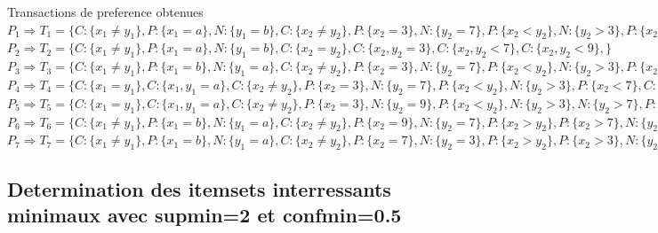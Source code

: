 \documentclass[a4paper,12pt,openany,oneside]{article}
\begin{document}
        
        Transactions de preference obtenues\\
        
        \noindent $P_{1}\Rightarrow T_{1}=\{C:\{x_{1}\neq y_{1}\},P:\{x_{1}=a\},N:\{y_{1}=b\},C:\{x_{2}\neq y_{2}\},P:\{x_{2}=3\},N:\{y_{2}=7\},P:\{x_{2}<y_{2}\},N:\{y_{2}>3\},P:\{x_{2}<7\},C:\{x_{2},y_{2}<9\},\}$ \\
        
        \noindent $P_{2}\Rightarrow T_{2}=\{C:\{x_{1}\neq y_{1}\},P:\{x_{1}=a\},N:\{y_{1}=b\},C:\{x_{2}=y_{2}\},C:\{x_{2},y_{2}=3\},C:\{x_{2},y_{2}<7\},C:\{x_{2},y_{2}<9\},\}$ \\
        
        \noindent $P_{3}\Rightarrow T_{3}=\{C:\{x_{1}\neq y_{1}\},P:\{x_{1}=b\},N:\{y_{1}=a\},C:\{x_{2}\neq y_{2}\},P:\{x_{2}=3\},N:\{y_{2}=7\},P:\{x_{2}<y_{2}\},N:\{y_{2}>3\},P:\{x_{2}<7\},C:\{x_{2},y_{2}<9\},\}$ \\
        
        \noindent $P_{4}\Rightarrow T_{4}=\{C:\{x_{1}=y_{1}\},C:\{x_{1},y_{1}=a\},C:\{x_{2}\neq y_{2}\},P:\{x_{2}=3\},N:\{y_{2}=7\},P:\{x_{2}<y_{2}\},N:\{y_{2}>3\},P:\{x_{2}<7\},C:\{x_{2},y_{2}<9\},\}$ \\
        
        \noindent $P_{5}\Rightarrow T_{5}=\{C:\{x_{1}=y_{1}\},C:\{x_{1},y_{1}=a\},C:\{x_{2}\neq y_{2}\},P:\{x_{2}=3\},N:\{y_{2}=9\},P:\{x_{2}<y_{2}\},N:\{y_{2}>3\},N:\{y_{2}>7\},P:\{x_{2}<7\},P:\{x_{2}<9\},\}$ \\
        
        \noindent $P_{6}\Rightarrow T_{6}=\{C:\{x_{1}\neq y_{1}\},P:\{x_{1}=b\},N:\{y_{1}=a\},C:\{x_{2}\neq y_{2}\},P:\{x_{2}=9\},N:\{y_{2}=7\},P:\{x_{2}>y_{2}\},P:\{x_{2}>7\},N:\{y_{2}<9\},C:\{x_{2},y_{2}>3\},\}$ \\
        
        \noindent $P_{7}\Rightarrow T_{7}=\{C:\{x_{1}\neq y_{1}\},P:\{x_{1}=b\},N:\{y_{1}=a\},C:\{x_{2}\neq y_{2}\},P:\{x_{2}=7\},N:\{y_{2}=3\},P:\{x_{2}>y_{2}\},P:\{x_{2}>3\},N:\{y_{2}<7\},C:\{x_{2},y_{2}<9\},\}$ \\
        
        
       \newpage
       
        \subsection{Determination des itemsets interressants minimaux avec supmin=2 et confmin=0.5}
        
\end{document}

